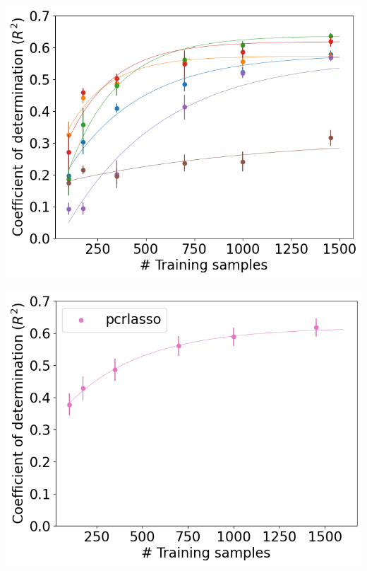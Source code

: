 \documentclass[a0paper,landscape,fontscale=0.365]{baposter}
\newenvironment{Figure}
  {\par\medskip\noindent\minipage{\linewidth}}
  {\endminipage\par\medskip}
\begin{document}
\begin{poster}
{\begin{multicols}{4}
    \begin{Figure}
        \centering
        \includegraphics[width=1.0\linewidth]{figures/curves_aug_5}
    \end{Figure}
    \columnbreak
    \begin{Figure}
        \centering
        \includegraphics[width=1.0\linewidth]{figures/curves_pcrlasso}
    \end{Figure}
    \columnbreak

\end{multicols}

}
\end{poster}
\end{document}
